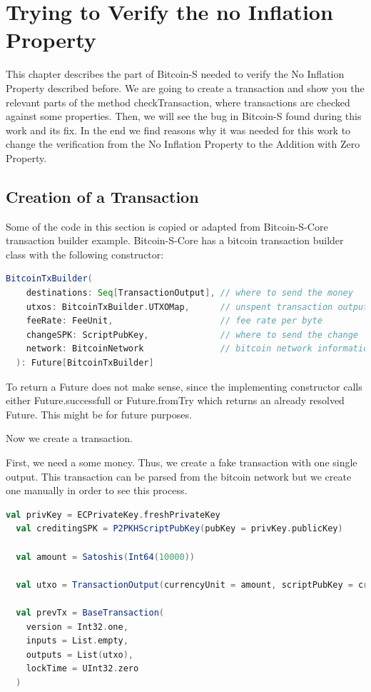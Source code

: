 \chapter{Trying to Verify the no Inflation Property}
\label{chap:verify_check}

This chapter describes the part of Bitcoin-S needed to verify the No Inflation Property described before.
We are going to create a transaction and show you the relevant parts of the method checkTransaction, where transactions are checked against some properties.
Then, we will see the bug in Bitcoin-S found during this work and its fix.
In the end we find reasons why it was needed for this work to change the verification from the No Inflation Property to the Addition with Zero Property.


\section{Creation of a Transaction}

Some of the code in this section is copied or adapted from Bitcoin-S-Core transaction builder example.\cite{BitcoinSCore:txbuilderexample}
Bitcoin-S-Core has a bitcoin transaction builder class with the following constructor:
\begin{lstlisting}[language=scala]
  BitcoinTxBuilder(
    destinations: Seq[TransactionOutput], // where to send the money
    utxos: BitcoinTxBuilder.UTXOMap,      // unspent transaction outputs
    feeRate: FeeUnit,                     // fee rate per byte
    changeSPK: ScriptPubKey,              // where to send the change
    network: BitcoinNetwork               // bitcoin network information
  ): Future[BitcoinTxBuilder]
\end{lstlisting}

To return a Future does not make sense, since the implementing constructor calls either Future.successfull or Future.fromTry which returns an already resolved Future.
This might be for future purposes.

Now we create a transaction.

First, we need a some money.
Thus, we create a fake transaction with one single output.
This transaction can be parsed from the bitcoin network but we create one manually in order to see this process.
\begin{lstlisting}[language=scala]
  val privKey = ECPrivateKey.freshPrivateKey
  val creditingSPK = P2PKHScriptPubKey(pubKey = privKey.publicKey)

  val amount = Satoshis(Int64(10000))

  val utxo = TransactionOutput(currencyUnit = amount, scriptPubKey = creditingSPK)

  val prevTx = BaseTransaction(
    version = Int32.one,
    inputs = List.empty,
    outputs = List(utxo),
    lockTime = UInt32.zero
  )
\end{lstlisting}

